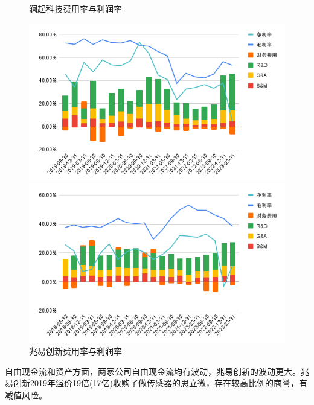 \documentclass[a4paper,12pt]{ctexart}
\begin{document}
\begin{figure}[H]
\begin{minipage}{0.48\linewidth}
    \end{minipage}
    \begin{minipage}{0.48\linewidth}
        \caption{澜起科技费用率与利润率}
        \centering
        \includegraphics[width=\linewidth]{img/lq2.png}
    \end{minipage}
    \begin{minipage}{0.48\linewidth}
        \caption{兆易创新费用率与利润率}
        \centering
        \includegraphics[width=\linewidth]{img/zy2.png}
    \end{minipage}
\end{figure}
自由现金流和资产方面，两家公司自由现金流均有波动，兆易创新的波动更大。兆易创新2019年溢价19倍(17亿)收购了做传感器的思立微，存在较高比例的商誉，有减值风险。
\end{document}
